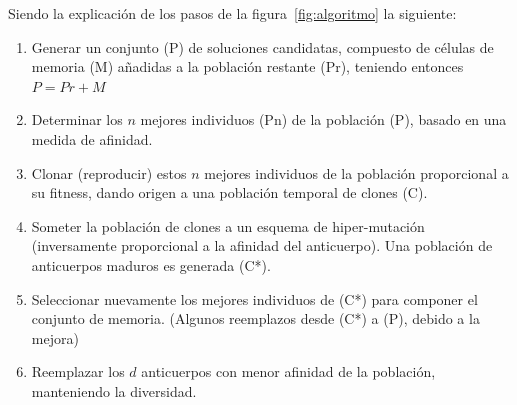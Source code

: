 Siendo la explicación de los pasos de la figura~\ref{fig:algoritmo} la siguiente:
\begin{enumerate}
    \item Generar un conjunto (P) de soluciones candidatas, compuesto de células de memoria (M) añadidas a la población restante (Pr), teniendo entonces $P = Pr + M$
    \item Determinar los $n$ mejores individuos (Pn) de la población (P), basado en una medida de afinidad.
    \item Clonar (reproducir) estos $n$ mejores individuos de la población proporcional a su fitness, dando origen a una población temporal de clones (C).
    \item Someter la población de clones a un esquema de hiper-mutación (inversamente proporcional a la afinidad del anticuerpo). Una población de anticuerpos maduros es generada (C*).
    \item Seleccionar nuevamente los mejores individuos de (C*) para componer el conjunto de memoria. (Algunos reemplazos desde (C*) a (P), debido a la mejora)
    \item Reemplazar los $d$ anticuerpos con menor afinidad de la población, manteniendo la diversidad.
\end{enumerate}

